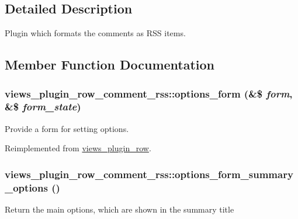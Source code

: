 \subsection{Detailed Description}
Plugin which formats the comments as RSS items. 

\subsection{Member Function Documentation}
\hypertarget{classviews__plugin__row__comment__rss_a6901603f7a3b8765dff9ac0b5d8208e4}{
\subsubsection[{options\_\-form}]{\setlength{\rightskip}{0pt plus 5cm}views\_\-plugin\_\-row\_\-comment\_\-rss::options\_\-form (\&\$ {\em form}, \/  \&\$ {\em form\_\-state})}}
\label{classviews__plugin__row__comment__rss_a6901603f7a3b8765dff9ac0b5d8208e4}
Provide a form for setting options. 

Reimplemented from \hyperlink{classviews__plugin__row_a6914c39d64977a0aa71da39cc1af004e}{views\_\-plugin\_\-row}.\hypertarget{classviews__plugin__row__comment__rss_a62f1381c8f5def6a790685208be61dae}{
\subsubsection[{options\_\-form\_\-summary\_\-options}]{\setlength{\rightskip}{0pt plus 5cm}views\_\-plugin\_\-row\_\-comment\_\-rss::options\_\-form\_\-summary\_\-options ()}}
\label{classviews__plugin__row__comment__rss_a62f1381c8f5def6a790685208be61dae}
Return the main options, which are shown in the summary title


